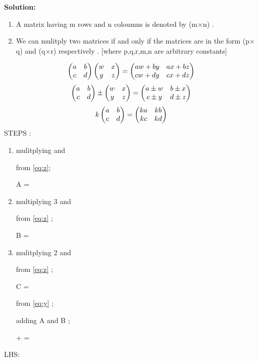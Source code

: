 \documentclass[journal,12pt,twocolumn]{IEEEtran}
\begin{document}
		\textbf{Solution:}
		\begin{enumerate}
			\item A matrix having m rows and n coloumns is denoted by
			(m$\times$n) .
			
			\item We can mulitply two matrices if and only if the matrices are 
			in the form (p$\times$q) and (q$\times$r) respectively .
			[where p,q,r,m,n are arbitrary constants]
		\end{enumerate}
                \begin{equation}
				\label{eq:x} 
				\begin{pmatrix}a & b \\c & d \end{pmatrix} \begin{pmatrix}w & x \\y & z \end{pmatrix} = 
				\begin{pmatrix}aw+ by & ax+ bz \\cw+ dy& cx+ dz\end{pmatrix} 
			\end{equation}
			    \begin{equation}
				\label{eq:y}
				\begin{pmatrix}a & b \\c & d \end{pmatrix} 
				\pm \begin{pmatrix}w & x \\y & z \end{pmatrix} =
				\begin{pmatrix}a\pm w & b\pm x \\c\pm y& d\pm z\end{pmatrix} 
			\end{equation}
			 \begin{equation}
				\label{eq:z}
				k\begin{pmatrix}a & b \\c & d \end{pmatrix} =
				\begin{pmatrix}ka & kb \\kc & kd \end{pmatrix} 
			\end{equation}
		STEPS :
		\begin{enumerate} [label=(\roman*)]
			\item mulitplying 
			 and 
			
			from \eqref{eq:z};

				A = \  

			\item multiplying $3$ and
			
			from \eqref{eq:z} ;

				B =  

			\item mulitplying 
			$2$ and  
			
			from \eqref{eq:z} ;
			
				C =  
				
			from \eqref{eq:y} ; 
			
			adding A and B ;
			
				 +  = 
		\end{enumerate} 
		{LHS}: 
		
\end{document}
